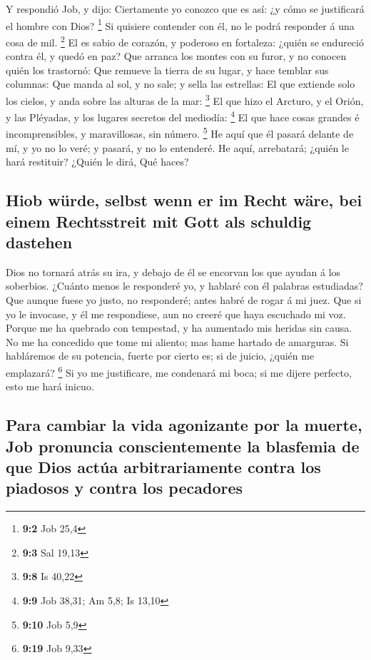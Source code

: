  Y respondió Job, y dijo:  Ciertamente yo
conozco que es así: ¿y cómo se justificará el hombre con Dios?
\footnote{\textbf{9:2} Job 25,4}  Si quisiere contender con
él, no le podrá responder á una cosa de mil. \footnote{\textbf{9:3} Sal
  19,13}  El es sabio de corazón, y poderoso en fortaleza:
¿quién se endureció contra él, y quedó en paz?  Que arranca
los montes con su furor, y no conocen quién los trastornó: 
Que remueve la tierra de su lugar, y hace temblar sus columnas:
 Que manda al sol, y no sale; y sella las estrellas:
 El que extiende solo los cielos, y anda sobre las alturas
de la mar: \footnote{\textbf{9:8} Is 40,22}  El que hizo el
Arcturo, y el Orión, y las Pléyadas, y los lugares secretos del
mediodía: \footnote{\textbf{9:9} Job 38,31; Am 5,8; Is 13,10}
 El que hace cosas grandes é incomprensibles, y
maravillosas, sin número. \footnote{\textbf{9:10} Job 5,9} 
He aquí que él pasará delante de mí, y yo no lo veré; y pasará, y no lo
entenderé.  He aquí, arrebatará; ¿quién le hará restituir?
¿Quién le dirá, Qué haces?

\hypertarget{hiob-wuxfcrde-selbst-wenn-er-im-recht-wuxe4re-bei-einem-rechtsstreit-mit-gott-als-schuldig-dastehen}{%
\subsection{Hiob würde, selbst wenn er im Recht wäre, bei einem
Rechtsstreit mit Gott als schuldig
dastehen}\label{hiob-wuxfcrde-selbst-wenn-er-im-recht-wuxe4re-bei-einem-rechtsstreit-mit-gott-als-schuldig-dastehen}}

 Dios no tornará atrás su ira, y debajo de él se encorvan
los que ayudan á los soberbios.  ¿Cuánto menos le
responderé yo, y hablaré con él palabras estudiadas?  Que
aunque fuese yo justo, no responderé; antes habré de rogar á mi juez.
 Que si yo le invocase, y él me respondiese, aun no creeré
que haya escuchado mi voz.  Porque me ha quebrado con
tempestad, y ha aumentado mis heridas sin causa.  No me ha
concedido que tome mi aliento; mas hame hartado de amarguras.
 Si habláremos de su potencia, fuerte por cierto es; si de
juicio, ¿quién me emplazará? \footnote{\textbf{9:19} Job 9,33}
 Si yo me justificare, me condenará mi boca; si me dijere
perfecto, esto me hará inicuo.

\hypertarget{para-cambiar-la-vida-agonizante-por-la-muerte-job-pronuncia-conscientemente-la-blasfemia-de-que-dios-actuxfaa-arbitrariamente-contra-los-piadosos-y-contra-los-pecadores}{%
\subsection{Para cambiar la vida agonizante por la muerte, Job pronuncia
conscientemente la blasfemia de que Dios actúa arbitrariamente contra
los piadosos y contra los
pecadores}\label{para-cambiar-la-vida-agonizante-por-la-muerte-job-pronuncia-conscientemente-la-blasfemia-de-que-dios-actuxfaa-arbitrariamente-contra-los-piadosos-y-contra-los-pecadores}}

